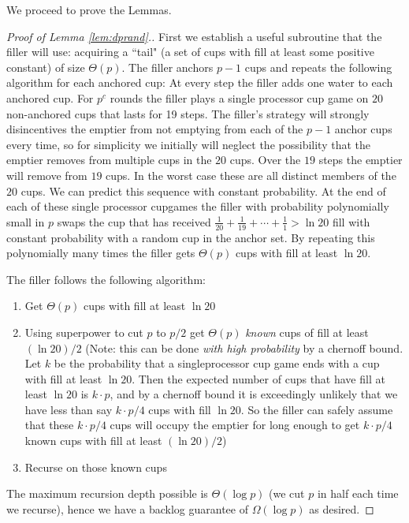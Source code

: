 \documentclass{article}[11pt]
\begin{document}
We proceed to prove the Lemmas. 

\begin{proof}[Proof of Lemma \ref{lem:dprand}.]
  First we establish a useful subroutine that the filler will use: acquiring a
  ``tail" (a set of cups with fill at least some positive constant) of size
  $\Theta(p)$.
  The filler anchors $p-1$ cups and repeats the following algorithm for each anchored cup:
  At every step the filler adds one water to each anchored cup. For $p^c$
  rounds the filler plays a single processor cup game on $20$ non-anchored cups
  that lasts for 19 steps. The filler's strategy will strongly disincentives
  the emptier from not emptying from each of the $p-1$ anchor cups every time,
  so for simplicity we initially will neglect the possibility that the emptier
  removes from multiple cups in the $20$ cups. Over the $19$ steps the emptier
  will remove from $19$ cups. In the worst case these are all distinct members
  of the $20$ cups. We can predict this sequence with constant probability.  At
  the end of each of these single processor cupgames the filler with
  probability polynomially small in $p$ swaps the cup that has received
  $\frac{1}{20} + \frac{1}{19} + \cdots + \frac{1}{1} > \ln 20$ fill with
  constant probability with a random cup in the anchor set. By repeating this
  polynomially many times the filler gets $\Theta(p)$ cups with fill at least
  $\ln 20$.

  The filler follows the following algorithm:
  \begin{enumerate}
    \item Get $\Theta(p)$ cups with fill at least $\ln 20$ 
    \item Using superpower to cut $p$ to $p/2$ get $\Theta(p)$ \emph{known}
      cups of fill at least $(\ln 20)/ 2$ (Note: this can be done \emph{with
      high probability} by a chernoff bound. Let $k$ be the  probability that a
      singleprocessor cup game ends with a cup with fill at least $\ln 20$.
      Then the expected number of cups that have fill at least $\ln 20$ is
      $k\cdot p$, and by a chernoff bound it is exceedingly unlikely that we
      have less than say $k\cdot p / 4$ cups with fill $\ln 20$. So the filler
      can safely assume that these $k\cdot p/4$ cups will occupy the emptier
      for long enough to get $k\cdot p / 4$ known cups with fill at least $(\ln
      20) /2$)
    \item Recurse on those known cups
  \end{enumerate}
  The maximum recursion depth possible is $\Theta(\log p)$ (we cut $p$ in half each time we recurse), hence we have a backlog guarantee of $\Omega(\log p)$ as desired.
\end{proof}
\end{document}
